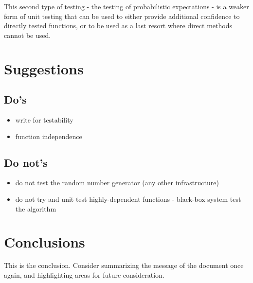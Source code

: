 \documentclass[a4paper, 11pt]{article}
\begin{document}
This second type of testing - the testing of probabilistic expectations - is a weaker form of unit testing that can be used to either provide additional confidence to directly tested functions, or to be used as a last resort where direct methods cannot be used.



\section{Suggestions}
\label{sec:suggestions}

\subsection{Do's}
\begin{itemize}
	\item write for testability
	\item function independence
\end{itemize}

\subsection{Do not's}
\begin{itemize}
	\item do not test the random number generator (any other infrastructure)
	\item do not try and unit test highly-dependent functions - black-box system test the algorithm
\end{itemize}


\section{Conclusions}
\label{sec:conclusions}
This is the conclusion. Consider summarizing the message of the document once again, and highlighting areas for future consideration.



\end{document}
